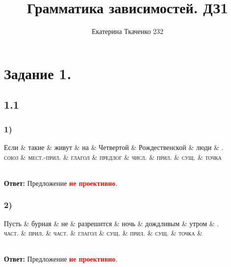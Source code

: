 \documentclass[14pt,extrafontsizes]{article}
\title{Грамматика зависимостей. ДЗ1}
\author{Екатерина Ткаченко 232}
\begin{document}
\maketitle

\section*{Задание 1.}
\subsection*{1.1}
\subsubsection*{1)}
\begin{dependency}[theme = simple]
\begin{deptext}[column sep=1em]
Если \& такие \& живут \& на \& Четвертой \& Рождественской \& люди \& . \\
\textsc{союз} \& \textsc{мест.-прил.} \& \textsc{глагол} \& \textsc{предлог} \& \textsc{числ.} \& \textsc{прил.} \& \textsc{сущ.} \& \textsc{точка} \\
\end{deptext}
\end{dependency}
\\
\textbf{Ответ: }Предложение \textcolor{red}{\textbf{не проективно}}.
\\
\subsubsection*{2)}
\begin{dependency}[theme = simple]
\begin{deptext}[column sep=1em]
Пусть \& бурная \& не \& разрешится \& ночь \& дождливым \& утром \& .\\
\textsc{част.} \& \textsc{прил.} \& \textsc{част.} \& \textsc{глагол} \& \textsc{сущ.} \& \textsc{прил.} \& \textsc{сущ.} \& \textsc{точка} \&\\
\end{deptext}
\end{dependency}
\\
\textbf{Ответ: }Предложение \textcolor{red}{\textbf{не проективно}}.
\\
\end{document}
